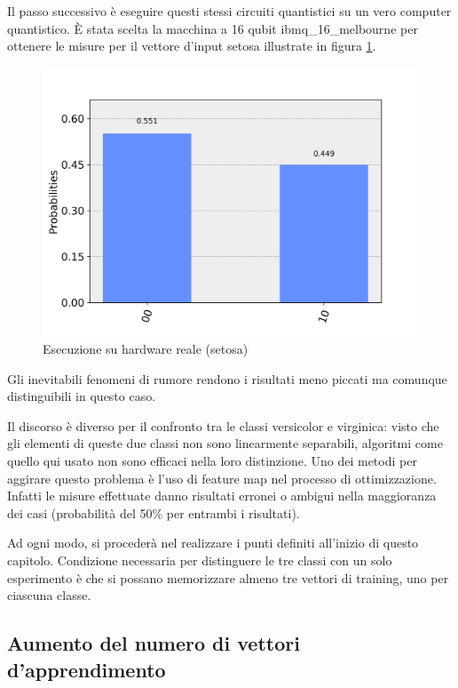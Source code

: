 Il passo successivo è eseguire questi stessi circuiti quantistici su un vero computer quantistico. 
È stata scelta la macchina a 16 qubit ibmq\_16\_melbourne per ottenere le misure per il 
vettore d'input setosa illustrate in figura \ref{fig:sperimentale_setosa}. 
\begin{figure}[h!]
    \centering
    \includegraphics[width=\linewidth]{gfx/misura_setosa_sperimentale}
    \caption{Esecuzione su hardware reale (setosa)}
    \label{fig:sperimentale_setosa}
\end{figure}
Gli inevitabili fenomeni di rumore rendono i risultati meno piccati ma comunque 
distinguibili in questo caso. 

Il discorso è diverso per il confronto tra le classi versicolor e 
virginica: visto che gli elementi di queste due classi non sono linearmente separabili, 
algoritmi come quello qui usato non sono efficaci nella loro distinzione. 
Uno dei metodi per aggirare questo problema è l'uso di feature map \cite{schuld} nel processo 
di ottimizzazione. Infatti le misure effettuate danno risultati erronei o 
ambigui nella maggioranza dei casi (probabilità del 50\% per entrambi i risultati). 

Ad ogni modo, si procederà nel realizzare i punti definiti all'inizio di 
questo capitolo. Condizione necessaria per distinguere le tre classi con un 
solo esperimento è che si possano memorizzare almeno tre vettori di training, 
uno per ciascuna classe. 

\subsection{Aumento del numero di vettori d'apprendimento}

